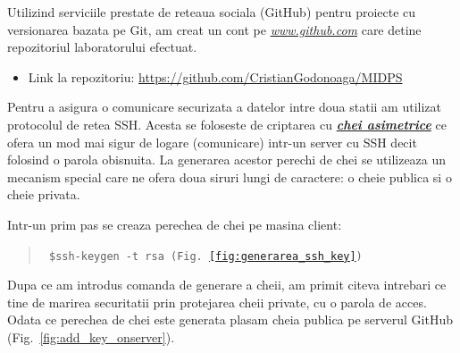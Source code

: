 \begin{flushleft} %
\end{flushleft}

Utilizind serviciile prestate de reteaua sociala (GitHub) pentru proiecte cu versionarea bazata pe Git, am creat un cont pe \emph{\url{www.github.com}} care detine repozitoriul laboratorului efectuat.

\newcommand*{\authorimg}[1]{%
	\raisebox{-.3\baselineskip}{%
		\texttt{[image: \#1]}%
	}%
}
\begin{itemize}
	\item[\authorimg{img/1.png}]
	\begin{center}
		Link la repozitoriu: \url{https://github.com/CristianGodonoaga/MIDPS}
	\end{center}
\end{itemize}


Pentru a asigura o comunicare securizata a datelor intre doua statii am utilizat protocolul de retea SSH. Acesta se foloseste de criptarea cu \emph{\textbf{\href{https://en.wikipedia.org/wiki/Public-key_cryptography}{chei asimetrice}}} ce ofera un mod mai sigur de logare (comunicare) intr-un server cu SSH decit folosind o parola obisnuita. La generarea acestor perechi de chei se utilizeaza un mecanism special care ne ofera doua siruri lungi de caractere: o cheie publica si o cheie privata.

Intr-un prim pas se creaza perechea de chei pe masina client:
\begin{quote}\tt
	\$ssh-keygen -t rsa \hfill (Fig.~\ref{fig:generarea_ssh_key})
\end{quote}


Dupa ce am introdus comanda de generare a cheii, am primit citeva intrebari ce tine de marirea securitatii prin protejarea cheii private, cu o parola de acces. Odata ce perechea de chei este generata plasam cheia publica pe serverul GitHub (Fig.~\ref{fig:add_key_onserver}).

